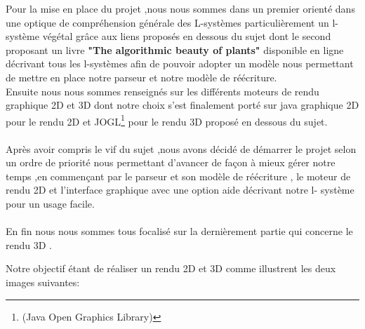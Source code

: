 Pour la mise en place du projet ,nous nous sommes dans un premier orienté dans une optique de compréhension générale des L-systèmes particulièrement un l-système végétal grâce aux liens proposés en dessous du sujet dont le second proposant un livre \textbf{"The algorithmic beauty of plants"}  disponible en ligne décrivant tous les l-systèmes afin de pouvoir adopter un modèle nous permettant de mettre en
place notre parseur et notre modèle de réécriture.
\\
Ensuite nous nous sommes
renseignés sur les différents moteurs de rendu graphique 2D et 3D dont notre
choix s’est finalement porté sur java graphique 2D pour le rendu 2D et JOGL\footnote{(Java Open Graphics Library)}
pour le rendu 3D proposé en dessous du sujet.
\\
\\
 Après avoir compris le vif du sujet ,nous avons décidé de démarrer le projet
selon un ordre de priorité nous permettant d’avancer de façon à mieux gérer notre
temps ,en commençant par le parseur et son modèle de réécriture , le moteur
de rendu 2D et l’interface graphique avec une option aide décrivant notre l-
système pour un usage facile.
\\
\\
En fin nous nous sommes tous focalisé  sur la dernièrement partie qui concerne le rendu 3D .

Notre objectif étant de réaliser un rendu 2D et 3D comme illustrent les deux images suivantes: 
    
